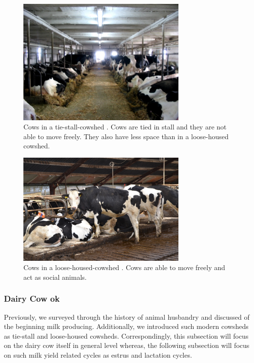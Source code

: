 \documentclass[english,12pt,a4paper,pdftex,elec,utf8]{aaltothesis}
\begin{document}
\begin{figure}
\centering
\includegraphics[width = 0.75\textwidth]{figures/tie-stall-barn.jpg}
\caption{Cows in a tie-stall-cowshed \cite{tiestallbarnpicture}. Cows are tied in stall and they are not able to move freely. They also have less space than in a loose-housed cowshed.}
\end{figure}

\begin{figure}
\centering
\includegraphics[width = 0.75\textwidth]{figures/free-stall-barn.jpg}
\caption{Cows in a loose-housed-cowshed \cite{freestallbarnpicture}. Cows are able to move freely and act as social animals.}
\end{figure}


\subsubsection{Dairy Cow ok} \label{dairycowsection}


Previously, we surveyed through the history of animal husbandry and discussed of the beginning milk producing. Additionally, we introduced such modern cowsheds as tie-stall and loose-housed cowsheds. Correspondingly, this subsection will focus on the dairy cow itself in general level whereas, the following subsection will focus on such milk yield related cycles as estrus and lactation cycles. 
\end{document}
